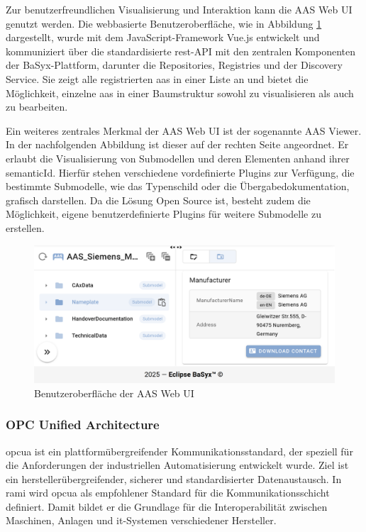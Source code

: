 Zur benutzerfreundlichen Visualisierung und Interaktion kann die AAS Web UI genutzt werden.
Die webbasierte Benutzeroberfläche, wie in Abbildung \ref{fig:BasyxWebUI} dargestellt, wurde mit dem JavaScript-Framework Vue.js entwickelt und kommuniziert über die standardisierte \acs{rest}-API mit den zentralen Komponenten der BaSyx-Plattform, darunter die Repositories, Registries und der Discovery Service.
Sie zeigt alle registrierten \acs{aas} in einer Liste an und bietet die Möglichkeit, einzelne \acs{aas} in einer Baumstruktur sowohl zu visualisieren als auch zu bearbeiten. 

Ein weiteres zentrales Merkmal der AAS Web UI ist der sogenannte AAS Viewer.
In der nachfolgenden Abbildung ist dieser auf der rechten Seite angeordnet.
Er erlaubt die Visualisierung von Submodellen und deren Elementen anhand ihrer semanticId. 
Hierfür stehen verschiedene vordefinierte Plugins zur Verfügung, die bestimmte Submodelle, wie das Typenschild oder die Übergabedokumentation, grafisch darstellen.
Da die Lösung Open Source ist, besteht zudem die Möglichkeit, eigene benutzerdefinierte Plugins für weitere Submodelle zu erstellen. \cite{BaSyxWiki,BaSyxEclipse} 

\vspace{0.5em}
\begin{figure}[htbp]
    \centering
    \includegraphics[width=1\textwidth]{Bilder/AASWebUZIGrundlagen.png}
    \caption[Benutzeroberfläche der AAS Web UI]{Benutzeroberfläche der AAS Web UI}
    \label{fig:BasyxWebUI}
\end{figure}


\subsubsection{OPC Unified Architecture}
\acs{opcua} ist ein plattformübergreifender Kommunikationsstandard, der speziell für die Anforderungen der industriellen Automatisierung entwickelt wurde.
Ziel ist ein herstellerübergreifender, sicherer und standardisierter Datenaustausch.
In \acs{rami} \cite{RAMI4.0} wird \acs{opcua} als empfohlener Standard für die Kommunikationsschicht definiert.
Damit bildet er die Grundlage für die Interoperabilität zwischen Maschinen, Anlagen und \acs{it}-Systemen verschiedener Hersteller.

